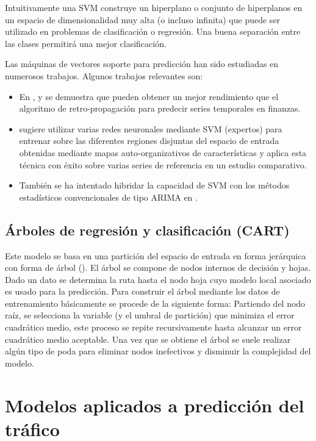 \documentclass{llncs}
\begin{document}
Intuitivamente una SVM construye un hiperplano o conjunto de hiperplanos en un espacio de dimensionalidad muy alta (o incluso infinita) que puede ser utilizado en problemas de clasificación o regresión. Una buena separación entre las clases permitirá una mejor clasificación.

Las máquinas de vectores soporte para predicción han sido estudiadas en numerosos trabajos. Algunos trabajos relevantes son:
\begin{itemize}

\item En \cite{cao2003support}, \cite{Tay2001309} y \cite{kim2003financial} se demuestra que pueden obtener un mejor rendimiento que el algoritmo de retro-propagación para predecir series temporales en finanzas. 
\item \cite{Cao2003321} sugiere utilizar varias redes neuronales mediante SVM (expertos) para entrenar sobre las diferentes regiones disjuntas del espacio de entrada obtenidas mediante mapas auto-organizativos de características y aplica esta técnica con éxito sobre varias series de referencia en un estudio comparativo.
\item También se ha intentado hibridar la capacidad de SVM con los métodos estadísticos convencionales de tipo ARIMA en \cite{pai2005hybrid}.
 
\end{itemize}


\subsection{Árboles de regresión y clasificación (CART)}
Este modelo se basa en una partición del espacio de entrada en forma jerárquica con forma de árbol (\cite{breiman1984classification}). El árbol se compone de nodos internos de decisión y hojas. Dado un dato se determina la ruta hasta el nodo hoja cuyo modelo local asociado es usado para la predicción.  Para construir el árbol mediante los datos de entrenamiento básicamente se procede de la siguiente forma: 
Partiendo del nodo raíz, se selecciona la variable (y el umbral de partición) que minimiza el error cuadrático medio, este proceso se repite recursivamente hasta alcanzar un error cuadrático medio aceptable. Una vez que se obtiene el árbol se suele realizar algún tipo de poda para eliminar nodos inefectivos y disminuir la complejidad del modelo.



\section{Modelos aplicados a predicción del tráfico}
\end{document}

